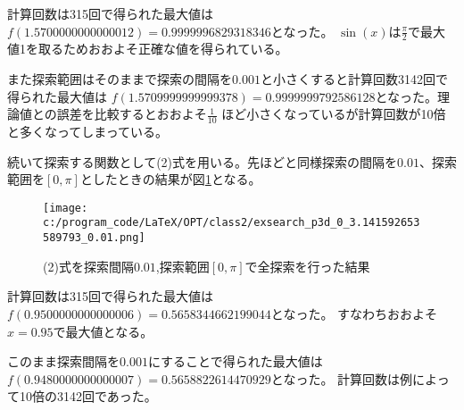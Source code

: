 \documentclass[a4paper,11pt,dvipdfmx]{jsarticle}
\begin{document}
計算回数は315回で得られた最大値は$f(1.5700000000000012)=0.9999996829318346$となった。
$\sin(x)$は$\frac{\pi}{2}$で最大値1を取るためおおよそ正確な値を得られている。

また探索範囲はそのままで探索の間隔を$0.001$と小さくすると計算回数3142回で得られた最大値は
$f(1.5709999999999378)=0.9999999792586128$となった。理論値との誤差を比較するとおおよそ$\frac{1}{10}$
ほど小さくなっているが計算回数が10倍と多くなってしまっている。

続いて探索する関数として(2)式を用いる。先ほどと同様探索の間隔を$0.01$、探索範囲を$[0,\pi]$としたときの結果が図\ref{ep0p0.01}となる。
\begin{figure}[h]
    \centering
    \texttt{[image: c:/program\_code/LaTeX/OPT/class2/exsearch\_p3d\_0\_3.141592653589793\_0.01.png]}
    \caption{(2)式を探索間隔$0.01$,探索範囲$[0,\pi]$で全探索を行った結果}
    \label{ep0p0.01}
\end{figure}

計算回数は315回で得られた最大値は$f(0.9500000000000006)=0.5658344662199044$となった。
すなわちおおよそ$x=0.95$で最大値となる。

このまま探索間隔を$0.001$にすることで得られた最大値は$f(0.9480000000000007)=0.5658822614470929$となった。
計算回数は例によって10倍の3142回であった。






\end{document}
